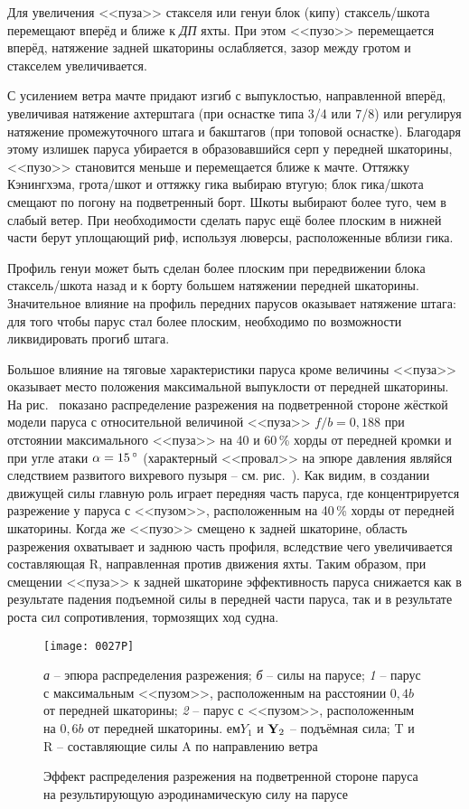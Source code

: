 Для увеличения <<пуза>> стакселя или генуи блок (кипу)
стаксель\-/шкота перемещают вперёд и ближе к \textit{ДП} яхты. При
этом <<пузо>> перемещается вперёд, натяжение задней шкаторины
ослабляется, зазор между гротом и стакселем увеличивается.

С усилением ветра мачте придают изгиб с выпуклостью, направленной
вперёд, увеличивая натяжение ахтерштага (при оснастке типа 3/4 или
7/8) или регулируя натяжение промежуточного штага и бакштагов (при
топовой оснастке). Благодаря этому излишек паруса убирается в
образовавшийся серп у передней шкаторины, <<пузо>> становится меньше и
перемещается ближе к мачте. Оттяжку Кэнингхэма, грота\-/шкот и оттяжку
гика выбираю втугую; блок гика\-/шкота смещают по погону на
подветренный борт. Шкоты выбирают более туго, чем в слабый ветер. При
необходимости сделать парус ещё более плоским в нижней части берут
уплощающий риф, используя люверсы, расположенные вблизи гика.

Профиль генуи может быть сделан более плоским при передвижении блока
стаксель\-/шкота назад и к борту большем натяжении передней
шкаторины. Значительное влияние на профиль передних парусов оказывает
натяжение штага: для того чтобы парус стал более плоским, необходимо
по возможности ликвидировать прогиб штага.

Большое влияние на тяговые характеристики паруса кроме величины
<<пуза>> оказывает место положения максимальной выпуклости от передней
шкаторины. На рис.~ показано распределение разрежения на
подветренной стороне жёсткой модели паруса с относительной величиной
<<пуза>> $f/b = 0,188$ при отстоянии максимального <<пуза>> на 40 и
60\,\% хорды от передней кромки и при угле атаки $\alpha = 15\,^\circ$
(характерный <<провал>> на эпюре давления являйся следствием развитого
вихревого пузыря \--- см. рис.~). Как видим, в создании
движущей силы главную роль играет передняя часть паруса, где
концентрируется разрежение у паруса с <<пузом>>, расположенным на
40\,\% хорды от передней шкаторины. Когда же <<пузо>> смещено к задней
шкаторине, область разрежения охватывает и заднюю часть профиля,
вследствие чего увеличивается составляющая \ve R, направленная против
движения яхты. Таким образом, при смещении <<пуза>> к задней шкаторине
эффективность паруса снижается как в результате падения подъемной силы
в передней части паруса, так и в результате роста сил сопротивления,
тормозящих ход судна.

\begin{figure}[htb]
  \centering
  \texttt{[image: 0027P]}
  \caption{Эффект распределения разрежения на подветренной стороне паруса на результирующую аэродинамическую силу на парусе}
  \label{fig:27}
  \small
  \centering{}
  \textit{а} \--- эпюра распределения разрежения; \textit{б} \--- силы на парусе; \textit{1} \--- парус с максимальным <<пузом>>, расположенным на расстоянии $0,4 b$ от передней шкаторины; \textit{2} \--- парус с <<пузом>>, расположенным на $0,6 b$ от передней шкаторины. $ем Y_1$ и $\mathbf{Y}_2$ \--- подъёмная сила; \ve T и \ve R \--- составляющие силы \ve A по направлению ветра
\end{figure}


